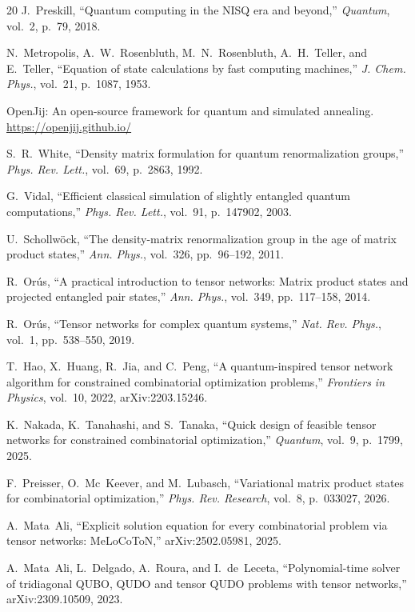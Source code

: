 \documentclass[10pt,a4paper]{article}
\begin{document}
\begin{thebibliography}{20}
J.~Preskill, ``Quantum computing in the NISQ era and beyond,''
\emph{Quantum}, vol.~2, p.~79, 2018.

N.~Metropolis, A.~W.~Rosenbluth, M.~N.~Rosenbluth, A.~H.~Teller,
and E.~Teller,
``Equation of state calculations by fast computing machines,''
\emph{J. Chem. Phys.}, vol.~21, p.~1087, 1953.

OpenJij: An open-source framework for quantum and simulated annealing.
\url{https://openjij.github.io/}

S.~R.~White, ``Density matrix formulation for quantum renormalization
groups,''
\emph{Phys. Rev. Lett.}, vol.~69, p.~2863, 1992.

G.~Vidal, ``Efficient classical simulation of slightly entangled
quantum computations,''
\emph{Phys. Rev. Lett.}, vol.~91, p.~147902, 2003.

U.~Schollw\"ock, ``The density-matrix renormalization group in the
age of matrix product states,''
\emph{Ann. Phys.}, vol.~326, pp.~96--192, 2011.

R.~Or\'us, ``A practical introduction to tensor networks: Matrix
product states and projected entangled pair states,''
\emph{Ann. Phys.}, vol.~349, pp.~117--158, 2014.

R.~Or\'us, ``Tensor networks for complex quantum systems,''
\emph{Nat. Rev. Phys.}, vol.~1, pp.~538--550, 2019.

T.~Hao, X.~Huang, R.~Jia, and C.~Peng,
``A quantum-inspired tensor network algorithm for constrained
combinatorial optimization problems,''
\emph{Frontiers in Physics}, vol.~10, 2022, arXiv:2203.15246.

K.~Nakada, K.~Tanahashi, and S.~Tanaka,
``Quick design of feasible tensor networks for constrained
combinatorial optimization,''
\emph{Quantum}, vol.~9, p.~1799, 2025.

F.~Preisser, O.~Mc~Keever, and M.~Lubasch,
``Variational matrix product states for combinatorial optimization,''
\emph{Phys. Rev. Research}, vol.~8, p.~033027, 2026.

A.~Mata~Ali, ``Explicit solution equation for every combinatorial
problem via tensor networks: MeLoCoToN,''
arXiv:2502.05981, 2025.

A.~Mata~Ali, L.~Delgado, A.~Roura, and I.~de~Leceta,
``Polynomial-time solver of tridiagonal QUBO, QUDO and tensor QUDO
problems with tensor networks,''
arXiv:2309.10509, 2023.


\end{thebibliography}
\end{document}
